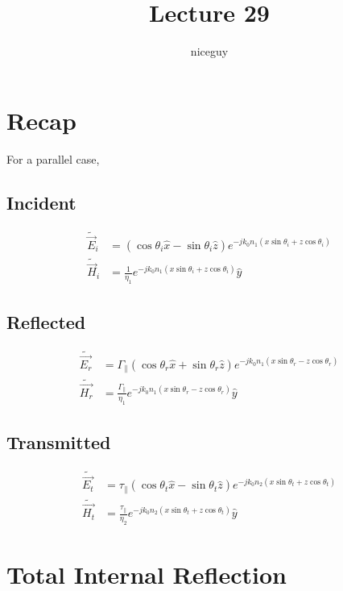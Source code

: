 \documentclass[12pt]{article}
\title{Lecture 29}
\author{niceguy}
\begin{document}
\maketitle

\section{Recap}

For a parallel case,

\subsection{Incident}

\begin{align*}
    \tilde{\vec E}_i &= (\cos\theta_i\hat x - \sin\theta_i\hat z)e^{-jk_0n_1(x\sin\theta_i + z\cos\theta_i)} \\
    \tilde{\vec H}_i &= \frac{1}{\eta_1}e^{-jk_0n_1(x\sin\theta_i + z\cos\theta_i)} \hat y
\end{align*}

\subsection{Reflected}

\begin{align*}
    \tilde{\vec{E_r}} &= \Gamma_\parallel (\cos\theta_r\hat x + \sin\theta_r\hat z)e^{-jk_0n_1(x\sin\theta_r - z\cos\theta_r)} \\
    \tilde{\vec{H_r}} &= \frac{\Gamma_\parallel}{\eta_1} e^{-jk_0n_1(x\sin\theta_r - z\cos\theta_r)} \hat y
\end{align*}

\subsection{Transmitted}

\begin{align*}
    \tilde{\vec{E_t}} &= \tau_\parallel(\cos\theta_t \hat x - \sin\theta_t\hat z)e^{-jk_0n_2(x\sin\theta_t + z\cos\theta_t)} \\
    \tilde{\vec{H_t}} &= \frac{\tau_\parallel}{\eta_2} e^{-jk_0n_2(x\sin\theta_t + z\cos\theta_t)} \hat y
\end{align*}

\section{Total Internal Reflection}
\end{document}
